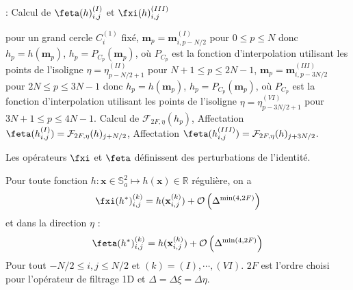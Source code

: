 \begin{center}
\begin{minipage}[H]{12cm}
  \begin{algorithm}[H]
    \caption{: Calcul de $\feta(h)_{i,j}^{(I)}$ et $\fxi(h)_{i,j}^{(III)}$}\label{alg:ftreta}
    \begin{algorithmic}[1]
    \State pour un grand cercle $C_i^{(1)}$ fixé,
             \State  $\mathbf{m}_p = \mathbf{m}_{i,p-N/2}^{(I)}$ pour $0  \leq p \leq N$ donc $h_p = h(\mathbf{m}_p)$,
             \State $h_p = P_{C_p}(\mathbf{m}_p)$, où $P_{C_p}$ est la fonction d'interpolation utilisant les points de l'isoligne $\eta = \eta^{(II)}_{p-N/2+1}$ pour $N+1 \leq p \leq 2N-1$,
             \State  $\mathbf{m}_p = \mathbf{m}_{i,p-3N/2}^{(III)}$ pour $2N  \leq p \leq 3N-1$ donc $h_p = h(\mathbf{m}_p)$,
             \State $h_p = P_{C_p}(\mathbf{m}_p)$, où $P_{C_p}$ est la fonction d'interpolation utilisant les points de l'isoligne $\eta = \eta^{(VI)}_{p-3N/2+1}$ pour $3N+1 \leq p \leq 4N-1$.
            \EndFor
    \State Calcul de $\mathcal{F}_{2F,\eta}(h_p)$,
    \State Affectation $\feta(h_{i,j}^{(I)}) = \mathcal{F}_{2F,\eta}(h)_{j+N/2}$,
    \State Affectation $\feta(h_{i,j}^{(III)}) = \mathcal{F}_{2F,\eta}(h)_{j+3N/2}$.
    \EndFor
    \end{algorithmic}
    \end{algorithm}
\end{minipage}
\end{center}
Les opérateurs $\fxi$ et $\feta$ définissent des perturbations de l'identité.
\begin{proposition}
Pour toute fonction $h : \mathbf{x} \in \mathbb{S}_a^2 \mapsto h(\mathbf{x}) \in \mathbb{R}$ régulière, on a 
\begin{equation}
\fxi(h^*)_{i,j}^{(k)} = h(\mathbf{x}_{i,j}^{(k)}) + \mathcal{O}\left( \Delta^{\min(4,2F)} \right)
\label{eq:consistance_fxi}
\end{equation}
et dans la direction $\eta$ :
\begin{equation}
\feta(h^*)_{i,j}^{(k)} = h(\mathbf{x}_{i,j}^{(k)}) + \mathcal{O}\left( \Delta^{\min(4,2F)} \right)
\label{eq:consistance_feta}
\end{equation}
Pour tout $-N/2 \leq i,j \leq N/2$ et $(k) = (I), \cdots , (VI)$. $2F$ est l'ordre choisi pour l'opérateur de filtrage 1D et $\Delta = \Delta \xi = \Delta \eta$.
\label{prop:consistance_ftrdir}
\end{proposition}


